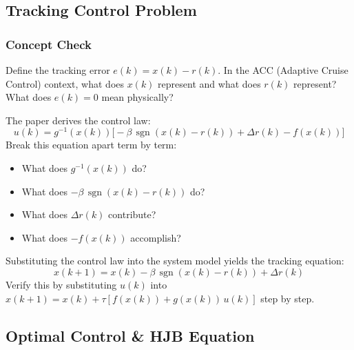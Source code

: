 \subsection{Tracking Control Problem}

\subsubsection*{Concept Check}

Define the tracking error $e(k) = x(k) - r(k)$. In the ACC (Adaptive Cruise Control) context, what does $x(k)$ represent and what does $r(k)$ represent? What does $e(k) = 0$ mean physically?

\begin{answerbox}\end{answerbox}

The paper derives the control law:
\[
  u(k) = g^{-1}(x(k))\bigl[-\beta\,\operatorname{sgn}(x(k) - r(k)) + \Delta r(k) - f(x(k))\bigr]
\]
Break this equation apart term by term:
\begin{itemize}[nosep]
  \item What does $g^{-1}(x(k))$ do?
  \item What does $-\beta\,\operatorname{sgn}(x(k) - r(k))$ do?
  \item What does $\Delta r(k)$ contribute?
  \item What does $-f(x(k))$ accomplish?
\end{itemize}

\begin{answerbox}\end{answerbox}

Substituting the control law into the system model yields the tracking equation:
\[
  x(k+1) = x(k) - \beta\,\operatorname{sgn}(x(k) - r(k)) + \Delta r(k)
\]
Verify this by substituting $u(k)$ into $x(k+1) = x(k) + \tau[f(x(k)) + g(x(k))\,u(k)]$ step by step.

\begin{largeanswer}\end{largeanswer}

\subsection{Optimal Control \& HJB Equation}

